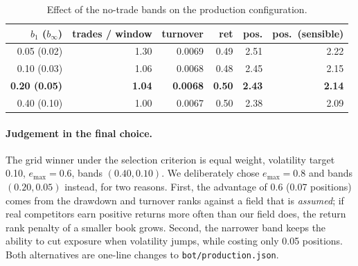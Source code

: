 \documentclass[11pt,a4paper]{article}
\newcommand{\code}[1]{\texttt{#1}}
\begin{document}
\begin{table}[h]
\centering\small
\begin{tabular}{rrrrrr}
\toprule
$b_1$ ($b_\infty$) & trades / window & turnover & ret & pos. & pos.\ (sensible) \\
\midrule
0.05 (0.02) & 1.30 & 0.0069 & 0.49 & 2.51 & 2.22 \\
0.10 (0.03) & 1.06 & 0.0068 & 0.48 & 2.45 & 2.15 \\
\textbf{0.20 (0.05)} & \textbf{1.04} & \textbf{0.0068} & \textbf{0.50} & \textbf{2.43} & \textbf{2.14} \\
0.40 (0.10) & 1.00 & 0.0067 & 0.50 & 2.38 & 2.09 \\
\bottomrule
\end{tabular}
\caption{Effect of the no-trade bands on the production configuration.}
\label{tab:bands}
\end{table}

\paragraph{Judgement in the final choice.} The grid winner under the selection criterion is equal weight, volatility
target 0.10, $e_{\max}=0.6$, bands $(0.40,0.10)$. We deliberately chose $e_{\max}=0.8$ and bands $(0.20,0.05)$ instead,
for two reasons. First, the advantage of 0.6 (0.07 positions) comes from the drawdown and turnover ranks against a field
that is \emph{assumed}; if real competitors earn positive returns more often than our field does, the return rank
penalty of a smaller book grows. Second, the narrower band keeps the ability to cut exposure when volatility jumps,
while costing only 0.05 positions. Both alternatives are one-line changes to \code{bot/production.json}.
\end{document}
